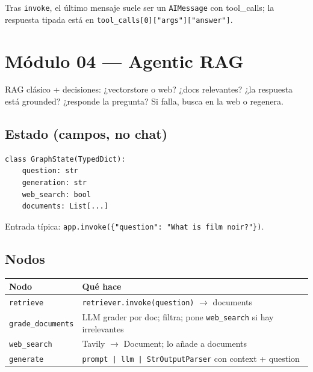 \documentclass[11pt,a4paper]{article}
\begin{document}
\begin{tip}[title=Leer la respuesta final]
Tras \texttt{invoke}, el último mensaje suele ser un \texttt{AIMessage} con tool\_calls;
la respuesta tipada está en \texttt{tool\_calls[0]["args"]["answer"]}.
\end{tip}

\section{Módulo 04 --- Agentic RAG}
\label{sec:rag}

\begin{concept}[title=Idea]
RAG clásico + decisiones:
¿vectorstore o web? ¿docs relevantes? ¿la respuesta está grounded? ¿responde la pregunta?
Si falla, busca en la web o regenera.
\end{concept}

\subsection{Estado (campos, no chat)}
\begin{lstlisting}
class GraphState(TypedDict):
    question: str
    generation: str
    web_search: bool
    documents: List[...]
\end{lstlisting}

Entrada típica: \texttt{app.invoke(\{"question": "What is film noir?"\})}.

\subsection{Nodos}
\begin{center}
\begin{tabular}{@{}lp{10.5cm}@{}}
\toprule
\textbf{Nodo} & \textbf{Qué hace} \\
\midrule
\texttt{retrieve} & \texttt{retriever.invoke(question)} $\to$ documents \\
\texttt{grade\_documents} & LLM grader por doc; filtra; pone \texttt{web\_search} si hay irrelevantes \\
\texttt{web\_search} & Tavily $\to$ Document; lo añade a documents \\
\texttt{generate} & \texttt{prompt | llm | StrOutputParser} con context + question \\
\bottomrule
\end{tabular}
\end{center}
\end{document}
